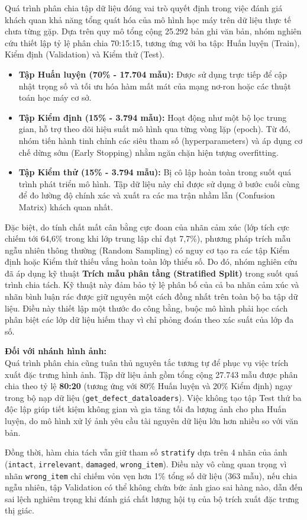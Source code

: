 Quá trình phân chia tập dữ liệu đóng vai trò quyết định trong việc đánh giá khách quan khả năng tổng quát hóa của mô hình học máy trên dữ liệu thực tế chưa từng gặp. Dựa trên quy mô tổng cộng 25.292 bản ghi văn bản, nhóm nghiên cứu thiết lập tỷ lệ phân chia 70:15:15, tương ứng với ba tập: Huấn luyện (Train), Kiểm định (Validation) và Kiểm thử (Test).

\begin{itemize}[labelsep=10pt, leftmargin=2cm]
    \item \textbf{Tập Huấn luyện (70\% - 17.704 mẫu):} Được sử dụng trực tiếp để cập nhật trọng số và tối ưu hóa hàm mất mát của mạng nơ-ron hoặc các thuật toán học máy cơ sở.
    \item \textbf{Tập Kiểm định (15\% - 3.794 mẫu):} Hoạt động như một bộ lọc trung gian, hỗ trợ theo dõi hiệu suất mô hình qua từng vòng lặp (epoch). Từ đó, nhóm tiến hành tinh chỉnh các siêu tham số (hyperparameters) và áp dụng cơ chế dừng sớm (Early Stopping) nhằm ngăn chặn hiện tượng overfitting.
    \item \textbf{Tập Kiểm thử (15\% - 3.794 mẫu):} Bị cô lập hoàn toàn trong suốt quá trình phát triển mô hình. Tập dữ liệu này chỉ được sử dụng ở bước cuối cùng để đo lường độ chính xác và xuất ra các ma trận nhầm lẫn (Confusion Matrix) khách quan nhất.
\end{itemize}

Đặc biệt, do tính chất mất cân bằng cực đoan của nhãn cảm xúc (lớp tích cực chiếm tới 64,6\% trong khi lớp trung lập chỉ đạt 7,7\%), phương pháp trích mẫu ngẫu nhiên thông thường (Random Sampling) có nguy cơ tạo ra các tập Kiểm định hoặc Kiểm thử thiếu vắng hoàn toàn lớp thiểu số. Do đó, nhóm nghiên cứu đã áp dụng kỹ thuật \textbf{Trích mẫu phân tầng (Stratified Split)} trong suốt quá trình chia tách. Kỹ thuật này đảm bảo tỷ lệ phân bố của cả ba nhãn cảm xúc và nhãn bình luận rác được giữ nguyên một cách đồng nhất trên toàn bộ ba tập dữ liệu. Điều này thiết lập một thước đo công bằng, buộc mô hình phải học cách phân biệt các lớp dữ liệu hiếm thay vì chỉ phỏng đoán theo xác suất của lớp đa số.

\vspace{0.5em}
\noindent\textbf{Đối với nhánh hình ảnh:}\\
Quá trình phân chia cũng tuân thủ nguyên tắc tương tự để phục vụ việc trích xuất đặc trưng hình ảnh. Tập dữ liệu ảnh gồm tổng cộng 27.743 mẫu được phân chia theo tỷ lệ \textbf{80:20} (tương ứng với 80\% Huấn luyện và 20\% Kiểm định) ngay trong bộ nạp dữ liệu (\texttt{get\_defect\_dataloaders}). Việc không tạo tập Test thứ ba độc lập giúp tiết kiệm không gian và gia tăng tối đa lượng ảnh cho pha Huấn luyện, do mô hình xử lý ảnh yêu cầu tài nguyên dữ liệu lớn hơn nhiều so với văn bản. 

Đồng thời, hàm chia tách vẫn giữ tham số \texttt{stratify} dựa trên 4 nhãn của ảnh (\texttt{intact}, \texttt{irrelevant}, \texttt{damaged}, \texttt{wrong\_item}). Điều này vô cùng quan trọng vì nhãn \texttt{wrong\_item} chỉ chiếm vỏn vẹn hơn 1\% tổng số dữ liệu (363 mẫu), nếu chia ngẫu nhiên, tập Validation có thể không chứa bức ảnh giao sai hàng nào, dẫn đến sai lệch nghiêm trọng khi đánh giá chất lượng hội tụ của bộ trích xuất đặc trưng thị giác.